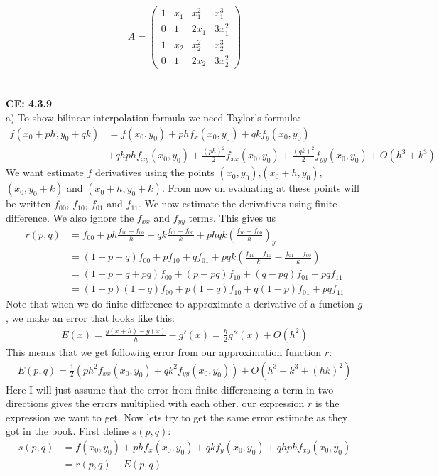 \documentclass[11pt,a4paper]{report}
\begin{document}
$$ 
A = 
 \begin{pmatrix}
  1 & x_1 & x_1^2 &  x_1^3 \\
  0 & 1 & 2x_1 & 3x_1^2 \\
  1 & x_2 & x_2^2  & x_2^3  \\
  0 & 1 & 2x_2  & 3x_2^2 
 \end{pmatrix}
$$
\\
\\
\textbf{CE: 4.3.9}
\\
a) To show bilinear interpolation formula we need Taylor's formula:
\begin{align*}
f(x_0+ph,y_0+qk)&= f(x_0,y_0) + phf_x(x_0,y_0)+qkf_y(x_0,y_0)\\
&+qhphf_{xy}(x_0,y_0)+\frac{(ph)^2}{2}f_{xx}(x_0,y_0)+\frac{(qk)^2}{2}f_{yy}(x_0,y_0) +O(h^3+k^3)
\end{align*}
We want estimate $f$ derivatives using the points $(x_0,y_0)$,$(x_0+h,y_0)$,$(x_0,y_0+k)$ and $(x_0+h,y_0+k)$. From now on evaluating at these points will be written $f_{00}$, $f_{10}$, $f_{01}$ and $f_{11}$. We now estimate the derivatives using finite difference. We also ignore the $f_{xx}$ and $f_{yy}$ terms. This gives us 
\begin{align*}
r(p,q)&=f_{00} +ph\frac{f_{10}-f_{00}}{h}+qk\frac{f_{01}-f_{00}}{k} +phqk(\frac{f_{10}-f_{00}}{h})_y \\
&=(1-p-q)f_{00} + pf_{10}+qf_{01} +pqk(\frac{f_{11}-f_{10}}{k}-\frac{f_{01}-f_{00}}{k}) \\
&= (1-p-q+pq)f_{00} +(p-pq)f_{10}+(q-pq)f_{01}+ pqf_{11} \\
&=(1-p)(1-q)f_{00}+p(1-q)f_{10}+q(1-p)f_{01}+ pqf_{11}
\end{align*} 
Note that when we do finite difference to approximate a derivative of a function $g$, we make an error that looks like this:
\begin{align*}
E(x)=\frac{g(x+h)-g(x)}{h}-g'(x) = \frac{h}{2}g''(x) + O(h^2)
\end{align*} 
This means that we get following error from our approximation function $r$:
\begin{align*}
E(p,q) = \frac{1}{2}(ph^2f_{xx}(x_0,y_0)+qk^2f_{yy}(x_0,y_0)) +O(h^3+k^3+(hk)^2) 
\end{align*}
Here I will just assume that the error from finite differencing a term in two directions gives the errors multiplied with each other. our expression $r$ is the expression we want to get. Now lets try to get the same error estimate as they got in the book. First define $s(p,q)$:
\begin{align*}
s(p,q)&= f(x_0,y_0) + phf_x(x_0,y_0)+qkf_y(x_0,y_0)
+qhphf_{xy}(x_0,y_0) \\
&=r(p,q)-E(p,q)
\end{align*}
\end{document}
